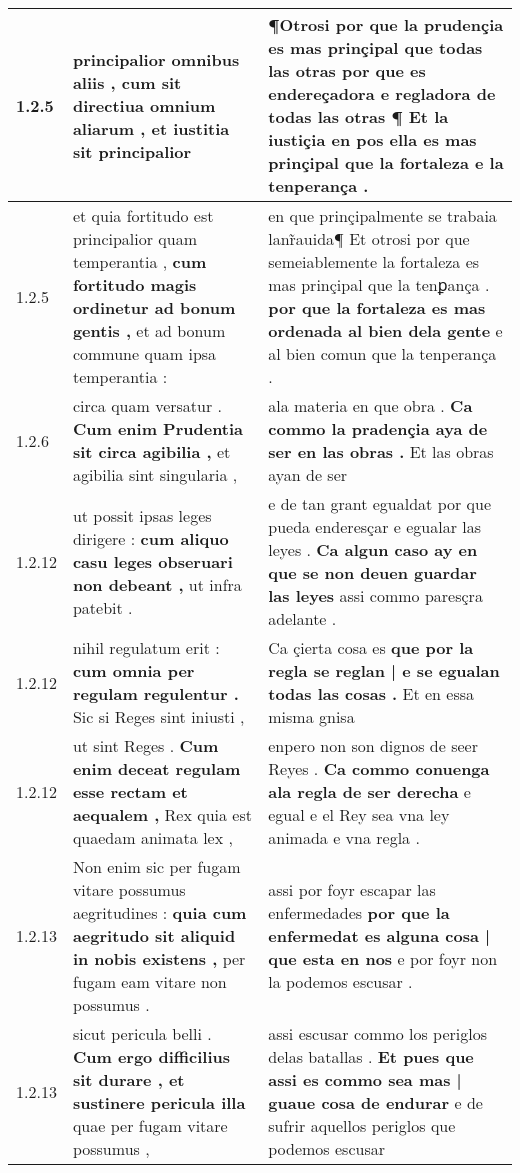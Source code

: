 \begin{tabular}{|p{1cm}|p{6.5cm}|p{6.5cm}|}
1.2.5 & principalior omnibus aliis , \textbf{ cum sit directiua omnium aliarum , } et iustitia sit principalior & ¶Otrosi por que la prudençia es mas prinçipal que todas las otras \textbf{ por que es endereçadora e regladora de todas las otras ¶ } Et la iustiçia en pos ella es mas prinçipal que la fortaleza e la tenperança . \\\hline
1.2.5 & et quia fortitudo est principalior quam temperantia , \textbf{ cum fortitudo magis ordinetur ad bonum gentis , } et ad bonum commune quam ipsa temperantia : & en que prinçipalmente se trabaia lanr̃auida¶ Et otrosi por que semeiablemente la fortaleza es mas prinçipal que la tenꝑança . \textbf{ por que la fortaleza es mas ordenada al bien dela gente } e al bien comun que la tenperança . \\\hline
1.2.6 & circa quam versatur . \textbf{ Cum enim Prudentia sit circa agibilia , } et agibilia sint singularia , & ala materia en que obra . \textbf{ Ca commo la pradençia aya de ser en las obras . } Et las obras ayan de ser \\\hline
1.2.12 & ut possit ipsas leges dirigere : \textbf{ cum aliquo casu leges obseruari non debeant , } ut infra patebit . & e de tan grant egualdat por que pueda enderesçar e egualar las leyes . \textbf{ Ca algun caso ay en que se non deuen guardar las leyes } assi commo paresçra adelante . \\\hline
1.2.12 & nihil regulatum erit : \textbf{ cum omnia per regulam regulentur . } Sic si Reges sint iniusti , & Ca çierta cosa es \textbf{ que por la regla se reglan | e se egualan todas las cosas . } Et en essa misma gnisa \\\hline
1.2.12 & ut sint Reges . \textbf{ Cum enim deceat regulam esse rectam et aequalem , } Rex quia est quaedam animata lex , & enpero non son dignos de seer Reyes . \textbf{ Ca commo conuenga ala regla de ser derecha } e egual e el Rey sea vna ley animada e vna regla . \\\hline
1.2.13 & Non enim sic per fugam vitare possumus aegritudines : \textbf{ quia cum aegritudo sit aliquid in nobis existens , } per fugam eam vitare non possumus . & assi por foyr escapar las enfermedades \textbf{ por que la enfermedat es alguna cosa | que esta en nos } e por foyr non la podemos escusar . \\\hline
1.2.13 & sicut pericula belli . \textbf{ Cum ergo difficilius sit durare , et sustinere pericula illa } quae per fugam vitare possumus , & assi escusar commo los periglos delas batallas . \textbf{ Et pues que assi es commo sea mas | guaue cosa de endurar } e de sufrir aquellos periglos que podemos escusar \\\hline

\end{tabular}
